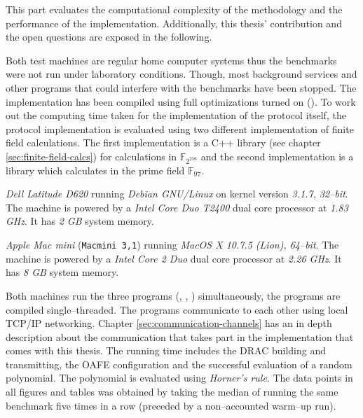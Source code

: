 \label{sec:evaluation}

This part evaluates the computational complexity of the methodology and the
performance of the implementation. Additionally, this thesis' contribution and
the open questions are exposed in the following.

%
%
\label{sec:test-setup}

\label{sec:test-machines}

Both test machines are regular home computer systems thus the benchmarks were
not run under laboratory conditions. Though, most background services and other
programs that could interfere with the benchmarks have been stopped. The
implementation has been compiled using full optimizations turned on
(). To work out the computing time
taken for the implementation of the protocol itself, the protocol implementation
is evaluated using two different implementation of finite field calculations.
The first implementation is a C++ library (see chapter
\ref{sec:finite-field-calcs}) for calculations in $\mathbb{F}_{2^{256}}$ and the
second implementation is a \JWThaskell{} library which calculates in the prime
field $\mathbb{F}_{97}$.



\emph{Dell Latitude D620} running \emph{Debian GNU/Linux} on kernel version
\emph{3.1.7, 32--bit}. The machine is powered by a \emph{Intel\TReg{} Core Duo
T2400} dual core processor at \emph{1.83 GHz}. It has \emph{2 GB} system memory.



\emph{Apple Mac mini} (\texttt{Macmini 3,1}) running \emph{MacOS X 10.7.5
(Lion), 64--bit}. The machine is powered by a \emph{Intel\TReg{} Core 2 Duo}
dual core processor at \emph{2.26 GHz}. It has \emph{8 GB} system memory.


Both machines run the three programs (\JWBpOne{}, \JWBpTwo{}, \JWBtoken{})
simultaneously, the programs are compiled single--threaded. The programs
communicate to each other using local TCP/IP networking. Chapter
\ref{sec:communication-channels} has an in depth description about the
communication that takes part in the implementation that comes with this thesis.
The running time includes the DRAC building and transmitting, the OAFE
configuration and the successful evaluation of a random polynomial. The
polynomial is evaluated using \emph{Horner's rule}\cite{cormen01}. The data
points in all figures and tables was obtained by taking the median of
running the same benchmark five times in a row (preceded by a non--accounted
warm--up run).


